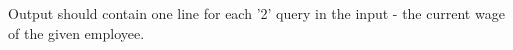 Output should contain one line for each '2' query in the input - the current wage of the given employee.

\
